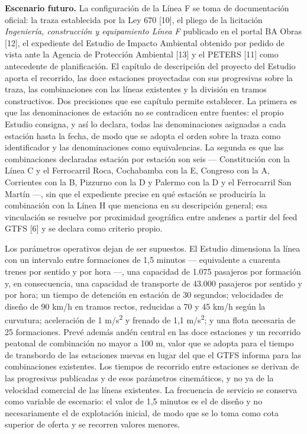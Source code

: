 \documentclass{article}
\begin{document}
\textbf{Escenario futuro.} La configuración de la Línea F se toma de documentación oficial: la traza
establecida por la Ley 670 [10], el pliego de la licitación \textit{Ingeniería, construcción y equipamiento
Línea F} publicado en el portal BA Obras [12], el expediente del Estudio de Impacto Ambiental obtenido por
pedido de vista ante la Agencia de Protección Ambiental [13] y el PETERS [11] como antecedente de
planificación. El capítulo de descripción del proyecto del Estudio aporta el recorrido, las doce estaciones
proyectadas con sus progresivas sobre la traza, las combinaciones con las líneas existentes y la división en
tramos constructivos. Dos precisiones que ese capítulo permite establecer. La primera es que las
denominaciones de estación no se contradicen entre fuentes: el propio Estudio consigna, y así lo declara,
todas las denominaciones asignadas a cada estación hasta la fecha, de modo que se adopta el orden sobre la
traza como identificador y las denominaciones como equivalencias. La segunda es que las combinaciones
declaradas estación por estación son seis --- Constitución con la Línea C y el Ferrocarril Roca, Cochabamba
con la E, Congreso con la A, Corrientes con la B, Pizzurno con la D y Palermo con la D y el Ferrocarril San
Martín ---, sin que el expediente precise en qué estación se produciría la combinación con la Línea H que
menciona en su descripción general; esa vinculación se resuelve por proximidad geográfica entre andenes a
partir del feed GTFS [6] y se declara como criterio propio.

Los parámetros operativos dejan de ser supuestos. El Estudio dimensiona la línea con un intervalo entre
formaciones de 1,5 minutos --- equivalente a cuarenta trenes por sentido y por hora ---, una capacidad de
1.075 pasajeros por formación y, en consecuencia, una capacidad de transporte de 43.000 pasajeros por
sentido y por hora; un tiempo de detención en estación de 30 segundos; velocidades de diseño de 90 km/h en
tramos rectos, reducidas a 70 y 45 km/h según la curvatura; aceleración de 1 m/s\textsuperscript{2} y
frenado de 1,1 m/s\textsuperscript{2}; y una flota necesaria de 25 formaciones. Prevé además andén central
en las doce estaciones y un recorrido peatonal de combinación no mayor a 100 m, valor que se adopta para el
tiempo de transbordo de las estaciones nuevas en lugar del que el GTFS informa para las combinaciones
existentes. Los tiempos de recorrido entre estaciones se derivan de las progresivas publicadas y de esos
parámetros cinemáticos, y no ya de la velocidad comercial de las líneas existentes. La frecuencia de
servicio se conserva como variable de escenario: el valor de 1,5 minutos es el de diseño y no
necesariamente el de explotación inicial, de modo que se lo toma como cota superior de oferta y se recorren
valores menores.
\end{document}
